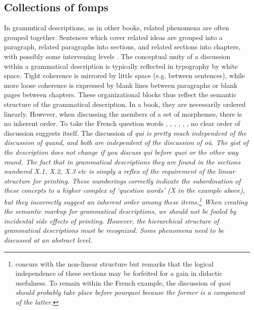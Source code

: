 \subsection{Collections of fomps}
In grammtical descriptions, as in other books, related phenomena are often grouped together. Sentences which cover related ideas are grouped into a paragraph, related paragraphs into sections, and related sections into chapters, with possibly some intervening levels \citep{Good2004}. The conceptual unity of a discussion within a grammatical description is typically reflected in typography by white space. Tight coherence is mirrored by little space (e.g. between sentences), while more loose coherence is expressed by blank lines between paragraphs or blank pages between chapters. These organizational blocks thus reflect the semantic structure of the grammatical description. In a book, they are necessarily ordered linearly. However, when discussing the members of a set of morphemes, there is no inherent order. To take the French question words
,
,
,
,
,
, no clear order of discussion suggests itself. The discussion of \em qui \em is pretty much independent of the discussion of \em quand\em, and both are independent of the discussion of \em où\em. The gist of the description does not change if you discuss \em qui \em before \em quoi \em or the other way round. The fact that in grammatical descriptions they are found in the sections numbered X.1, X.2, X.3 etc is simply a reflex of the requirement of the linear structure for printing. These numberings correctly indicate the subordination of these concepts to a higher complex of `question words' (X in the example above), but they incorrectly suggest an inherent  order among these items.\footnote{\citet{Good2004} 
 concurs with the non-linear structure but remarks that the logical independence of these sections may be forfeited for a gain in didactic usefulness. To remain within the French example, the discussion of \em quoi \em should probably take place before \em pourquoi \em because the former is a component of the latter.
} 
When creating the semantic markup for grammatical descriptions, we should not be fooled by incidental side effects of printing. However, the hierarchical structure of grammatical descriptions must be recognized. Some phenomena need to be discussed at an abstract level.


